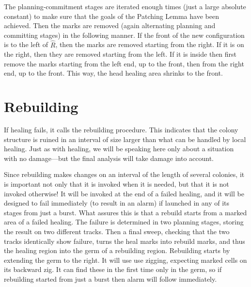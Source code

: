 \documentclass[12pt]{memoir}
\begin{document}
The planning-commitment stages are iterated enough times (just a large absolute constant)
to make sure that the goals of the Patching Lemma have been
achieved.
Then the marks are removed (again alternating planning and committing stages)
in the following manner.
If the front of the new configuration is to the left of \( \hat R \), then the marks 
are removed starting from the right.
If it is on the right, then they are removed starting from the left.
If it is inside then first remove the marks starting from the left end, up to the front, 
then from the right end, up to the front.
This way, the head healing area shrinks to the front.


\section{Rebuilding}\label{sec:rebuilding}

If healing fails, it calls the rebuilding procedure.
This indicates that the colony structure is ruined in an interval of size larger than 
what can be handled by local healing.
Just as with healing, we will be speaking here only about a situation with no 
damage---but the final analysis will take damage into account.

Since rebuilding makes changes on an interval of the length of several colonies,
it is important not only that it is invoked when it is needed, but that it is not
invoked otherwise!
It will be invoked at the end of a failed healing, and it will be designed
to fail immediately (to result in an alarm) 
if launched in any of its stages from just a burst.
What assures this is that a rebuild starts from a marked area of a failed
healing.
The failure is determined
in two planning stages, storing the result on two different tracks.
Then a final sweep, checking that the two tracks identically show failure, turns
the heal marks into rebuild marks, and thus the healing region into the germ of a
rebuilding region.
Rebuilding starts by extending the germ to the right.
It will use use zigging, expecting marked cells on its backward zig.
It can find these in the first time only in the germ, so if rebuilding 
started from just a burst then alarm will follow immediately.
\end{document}
